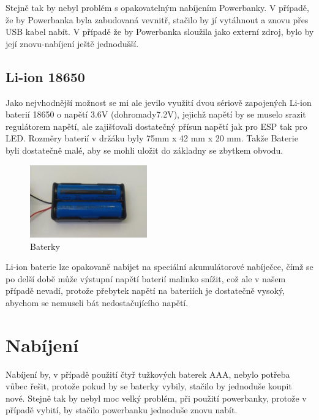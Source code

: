 Stejně tak by nebyl problém s opakovatelným nabíjením Powerbanky.  V případě, že by Powerbanka byla zabudovaná vevnitř, stačilo by jí vytáhnout a znovu přes USB kabel nabít. 
V případě že by Powerbanka sloužila jako externí zdroj, bylo by její znovu-nabíjení ještě jednodušší.


\subsection{Li-ion 18650}

Jako nejvhodnější možnost se mi ale jevilo využití dvou sériově zapojených Li-ion baterií 18650 o napětí 3.6V (dohromady7.2V), jejichž napětí by se muselo srazit regulátorem napětí, ale zajišťovali dostatečný přísun napětí jak pro ESP tak pro LED.  Rozměry baterií v držáku byly 75mm x 42 mm x 20 mm.  Takže Baterie byli dostatečně malé, aby se mohli uložit do základny se zbytkem obvodu.


\begin{figure}[htbp]
	\centering
	\includegraphics[width=0.45\textwidth]{img/02 ele/Battery_Pack.jpg}
	\caption{Baterky}
\end{figure}

Li-ion baterie lze opakovaně nabíjet na speciální akumulátorové nabíječce, čímž se po delší době může výstupní napětí baterií malinko snížit, což ale v našem případě nevadí, protože přebytek napětí na bateriích je dostatečně vysoký, abychom se nemuseli bát nedostačujícího napětí. 



\section{Nabíjení}
Nabíjení by, v případě použití čtyř tužkových baterek AAA, nebylo potřeba vůbec řešit, protože pokud by se baterky vybily, stačilo by jednoduše koupit nové. Stejně tak by nebyl moc velký problém, při použití powerbanky, protože v případě vybití, by stačilo powerbanku jednoduše znovu nabít.


